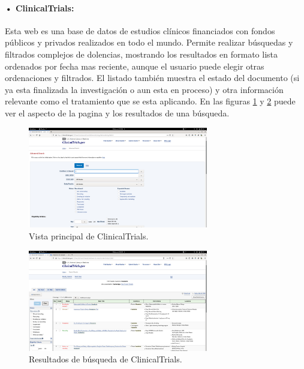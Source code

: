 \paragraph{• ClinicalTrials\cite{ref:clinicaltrials_home}:} Esta web es una base de datos de estudios clínicos financiados con fondos públicos y privados realizados en todo el mundo. Permite realizar búsquedas y filtrados complejos de dolencias, mostrando los resultados en formato lista ordenados por fecha mas reciente, aunque el usuario puede elegir otras ordenaciones y filtrados. El listado también muestra el estado del documento (si ya esta finalizada la investigación o aun esta en proceso) y otra información relevante como el tratamiento que se esta aplicando. En las figuras \ref{fig:clinical_trials1} y \ref{fig:clinical_trials2} puede ver el aspecto de la pagina y los resultados de una búsqueda.

\begin{figure}[h!]
   	\centering
	\includegraphics[width=0.7\textwidth]{images/ClinicalTrials.png}
	\caption{Vista principal de ClinicalTrials.}
	\label{fig:clinical_trials1}
\end{figure}

\begin{figure}[h!]
	\centering
	\includegraphics[width=0.7\textwidth]{images/ClinicalTrials2.png}
	\caption{Resultados de búsqueda de ClinicalTrials.}
	\label{fig:clinical_trials2}
\end{figure}

\newpage
